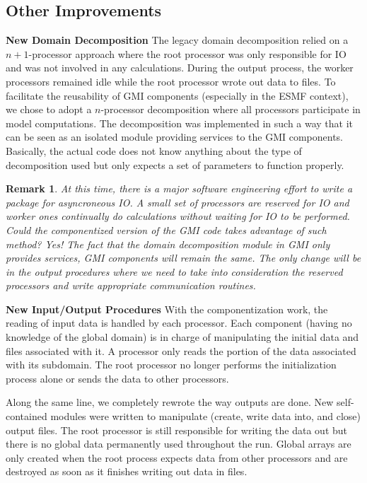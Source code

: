 \documentclass[11pt]{article}
\newtheorem{remark}{Remark}
\begin{document}
\subsection{Other Improvements}

\noindent
{\bf New Domain Decomposition} \newline
The legacy domain decomposition relied on a $n+1$-processor approach where
the root processor was only responsible for IO and was not involved in any
calculations. 
During the output process, the worker processors remained idle while the root
processor wrote out data to files.
To facilitate the reusability of GMI components (especially in the ESMF context),
we chose to adopt a $n$-processor decomposition where all processors participate
in model computations.
The decomposition was implemented in such a way that it can be seen as an
isolated module providing services to the GMI components.
Basically, the actual code does not know anything about the type of 
decomposition used but only expects a set of parameters to function properly.

\begin{remark}
At this time, there is a major software engineering effort to write a package
for asyncroneous IO. 
A small set of processors are reserved for IO and worker ones continually do
calculations without waiting for IO to be performed.
Could the componentized version of the GMI code takes advantage of such method?
Yes! The fact that the domain decomposition module in GMI only provides services,
GMI components will remain the same.
The only change will be in the output procedures where we need to take into consideration
the reserved processors and write appropriate communication routines.
\end{remark}

\vskip 0.60cm

\noindent
{\bf New Input/Output Procedures} \newline
With the componentization work, the reading of input data is handled by each
processor.
Each component (having no knowledge of the global domain) is in charge of 
manipulating the initial data and files associated with it.
A processor only reads the portion of the data associated with its subdomain.
The root processor no longer performs the initialization process alone or sends
the data to other processors.

Along the same line, we completely rewrote the way outputs are done.
New self-contained modules were written to manipulate (create, write data
into, and close) output files.
The root processor is still responsible for writing the data out but there
is no global data permanently used throughout the run.
Global arrays are only created when the root process expects data from other
processors and are destroyed as soon as it finishes writing out data in files.
\end{document}
